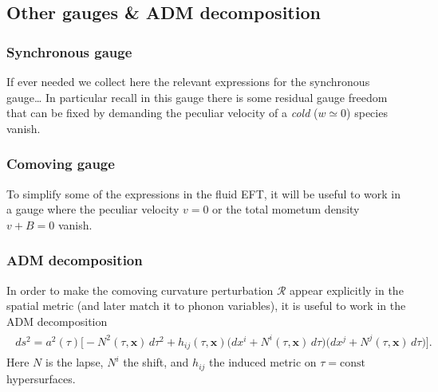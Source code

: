 \subsection{Other gauges \& ADM decomposition}

\subsubsection*{Synchronous gauge}
If ever needed we collect here the relevant expressions for the synchronous gauge\dots
In particular recall in this gauge there is some residual gauge freedom that can be fixed by demanding the peculiar velocity of a \emph{cold} ($w\simeq 0$) species vanish.


\subsubsection*{Comoving gauge}
To simplify some of the expressions in the fluid EFT, it will be useful to work in a gauge where the peculiar velocity $v=0$ or the total mometum density $v+B=0$ vanish.


\subsubsection{ADM decomposition}

In order to make the comoving curvature perturbation $\mathcal{R}$ appear explicitly in the spatial metric (and later match it to phonon variables), it is useful to work in the ADM decomposition
\begin{align}
\begin{aligned}
    ds^2
    =
    a^2(\tau)\Big[
    - N^2(\tau,\mathbf{x})\,d\tau^2
    +
    h_{ij}(\tau,\mathbf{x})\bigl(dx^i+N^i(\tau,\mathbf{x})\,d\tau\bigr)\bigl(dx^j+N^j(\tau,\mathbf{x})\,d\tau\bigr)
    \Big].
\end{aligned}
\end{align}
Here $N$ is the lapse, $N^i$ the shift, and $h_{ij}$ the induced metric on $\tau=\mathrm{const}$ hypersurfaces.

